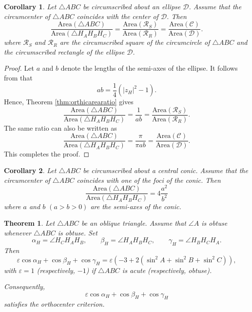 \documentclass[11pt,reqno]{amsart}
\newtheorem{theorem}{Theorem}[section]
\newtheorem{corollary}{Corollary}[section]
\theoremstyle{definition}
\numberwithin{equation}{section}
\begin{document}
\begin{corollary}
Let $\triangle ABC$ be circumscribed about an ellipse $\mathcal{D}$. Assume that the circumcenter of $\triangle ABC$ coincides with the center of $\mathcal D$. Then
    \begin{equation*}
    \frac{\mathrm{Area}(\triangle ABC)}{\mathrm{Area}(\triangle H_A H_B H_C)}=\frac{\mathrm{Area}(\mathcal{R}_S)}{\mathrm{Area}(\mathcal{R}_R)}=\frac{\mathrm{Area}(\mathcal{C})}{\mathrm{Area}(\mathcal{D})}.
\end{equation*}
where $\mathcal{R}_S$ and $\mathcal{R}_R$ are the circumscribed square of the circumcircle of $\triangle ABC$ and the circumscribed rectangle of the ellipse $\mathcal{D}$.
\end{corollary}
\begin{proof} Let $a$ and $b$ denote the lengths of the semi-axes of the ellipse. It follows from \cite[Corollary 2.2]{Murad2026b} that
\[
ab=\frac14\left(|z_H|^2-1\right).
\]
Hence, Theorem \ref{thm:orthicarearatio} gives
    \begin{equation*}
    \frac{\mathrm{Area}(\triangle ABC)}{\mathrm{Area}(\triangle H_A H_B H_C)}=\frac{1}{ab}=\frac{\mathrm{Area}(\mathcal{R}_S)}{\mathrm{Area}(\mathcal{R}_R)}.
\end{equation*}
The same ratio can also be written as 
    \begin{equation*}
    \frac{\mathrm{Area}(\triangle ABC)}{\mathrm{Area}(\triangle H_A H_B H_C)}=\frac{\pi}{\pi ab}=\frac{\mathrm{Area}(\mathcal{C})}{\mathrm{Area}(\mathcal{D})}.
    \end{equation*}
This completes the proof.
\end{proof}

\begin{corollary}
Let $\triangle ABC$ be circumscribed about a central conic. Assume that the circumcenter of $\triangle ABC$ coincides with one of the foci of the conic. Then
    \begin{equation*}
    \frac{\mathrm{Area}(\triangle ABC)}{\mathrm{Area}(\triangle H_A H_B H_C)}=4\frac{a^2}{b^2}
\end{equation*}
where $a$ and $b$ $(a>b>0)$ are the semi-axes of the conic.
\end{corollary}

\begin{theorem}\label{thm:alphah}
Let $\triangle ABC$ be an oblique triangle. Assume that $\angle A$ is obtuse whenever $\triangle ABC$ is obtuse. Set
\begin{equation*}
    \alpha_H=\angle H_CH_AH_B,\qquad 
\beta_H=\angle H_AH_BH_C,\qquad 
\gamma_H=\angle H_BH_CH_A.
\end{equation*}
Then
\begin{equation*}
    \varepsilon\cos \alpha_H+\cos \beta_H+\cos \gamma_H=\varepsilon(-3+2(\sin^2 A+\sin^2 B+\sin^2 C)),
\end{equation*}
with $\varepsilon=1$ (respectively, $-1$) if $\triangle ABC$ is acute (respectively, obtuse).

Consequently,
\[
\varepsilon\cos \alpha_H+\cos \beta_H+\cos \gamma_H
\]
satisfies the orthocenter criterion.
\end{theorem}
\end{document}
